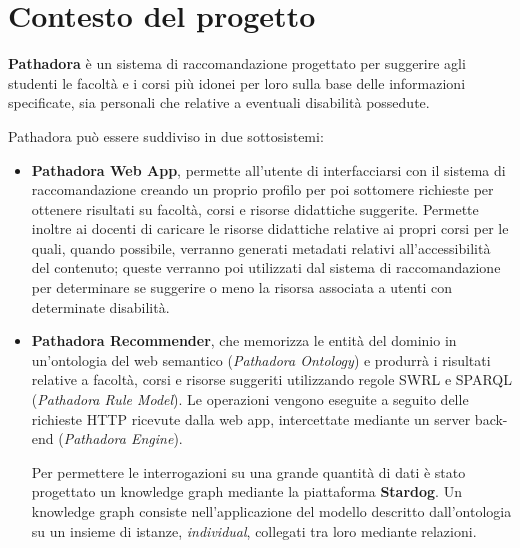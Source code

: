 \clearpage{\pagestyle{empty}\cleardoublepage}
\chapter{Contesto del progetto}

\textbf{Pathadora} è un sistema di raccomandazione progettato per suggerire agli studenti le facoltà e i corsi più idonei per loro sulla base delle informazioni specificate, sia personali che relative a eventuali disabilità possedute. 

Pathadora può essere suddiviso in due sottosistemi: 
\begin{itemize}
\item \textbf{Pathadora Web App}, permette all'utente di interfacciarsi con il sistema di raccomandazione creando un proprio profilo per poi sottomere richieste per ottenere risultati su facoltà, corsi e risorse didattiche suggerite. Permette inoltre ai docenti di caricare le risorse didattiche relative ai propri corsi per le quali, quando possibile, verranno generati metadati relativi all'accessibilità del contenuto; queste verranno poi utilizzati dal sistema di raccomandazione per determinare se suggerire o meno la risorsa associata a utenti con determinate disabilità.
\item \textbf{Pathadora Recommender}, che memorizza le entità del dominio in un'ontologia del web semantico (\textit{Pathadora Ontology}) e produrrà i risultati relative a facoltà, corsi e risorse suggeriti utilizzando regole SWRL e SPARQL (\textit{Pathadora Rule Model}). Le operazioni vengono eseguite a seguito delle richieste HTTP ricevute dalla web app, intercettate mediante un server back-end (\textit{Pathadora Engine}).

Per permettere le interrogazioni su una grande quantità di dati è stato progettato un knowledge graph mediante la piattaforma \textbf{Stardog}. Un knowledge graph consiste nell'applicazione del modello descritto dall'ontologia su un insieme di istanze, \textit{individual}, collegati tra loro mediante relazioni.
\end{itemize}

